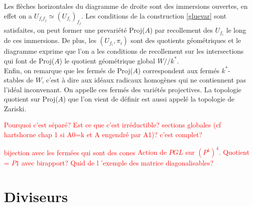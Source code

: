 \begin{multicols}{2}
	\begin{center}
	\\
	\end{center}
	
	\columnbreak
	\begin{center}
	\\
	\end{center}
\end{multicols}
Les flèches horizontales du diagramme de droite sont des immersions ouvertes, en effet on a $U_{f_if_j}\simeq (U_{f_i})_{f_j}$. Les conditions de la construction \ref{gluevar} sont satisfaites, on peut former une prevariété Proj($A$) par recollement des $U_{f_i}$ le long de ces immersions. De plus, les $(U_{f_i},\pi_i)$ sont des quotients géométriques et le diagramme exprime que l'on a les conditions de recollement sur les intersections qui font de Proj($A$) le quotient géométrique global $W//k^*$.\\
Enfin, on remarque que les fermés de Proj($A$) correspondent aux fermés $k^*$-stables de $W$, c'est à dire aux idéaux radicaux homogènes qui ne contiennent pas l'idéal inconvenant. On appelle ces fermés des variétés projectives. La topologie quotient sur Proj($A$) que l'on vient de définir est aussi appelé la topologie de Zariski.

\textcolor{red}{Pourquoi c'est séparé?}
\textcolor{red}{Est ce que c'est irréductible?}
\textcolor{red}{sections globales (cf hartshorne chap 1 si A0=k et A engendré par A1)? c'est complet?}

\textcolor{red}{bijection avec les fermées qui sont des cones}
\textcolor{red}{Action de $PGL$ sur $(P^1)^4$. Quotient = $P1$ avec birapport?}
\textcolor{red}{Quid de l 'exemple des matrice diagonalisables?}


\section{Diviseurs}

